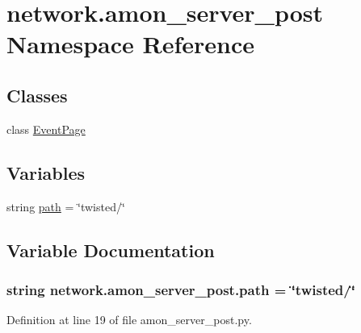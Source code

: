 \hypertarget{namespacenetwork_1_1amon__server__post}{\section{network.\-amon\-\_\-server\-\_\-post Namespace Reference}
\label{namespacenetwork_1_1amon__server__post}
}
\subsection*{Classes}
\begin{DoxyCompactItemize}
\item 
class \hyperlink{classnetwork_1_1amon__server__post_1_1_event_page}{Event\-Page}
\end{DoxyCompactItemize}
\subsection*{Variables}
\begin{DoxyCompactItemize}
\item 
string \hyperlink{namespacenetwork_1_1amon__server__post_aa871965a8bb9166b2aedc5cf739d6e5c}{path} = \char`\"{}twisted/\char`\"{}
\end{DoxyCompactItemize}


\subsection{Variable Documentation}
\hypertarget{namespacenetwork_1_1amon__server__post_aa871965a8bb9166b2aedc5cf739d6e5c}{
\subsubsection[{path}]{\setlength{\rightskip}{0pt plus 5cm}string network.\-amon\-\_\-server\-\_\-post.\-path = \char`\"{}twisted/\char`\"{}}}\label{namespacenetwork_1_1amon__server__post_aa871965a8bb9166b2aedc5cf739d6e5c}


Definition at line 19 of file amon\-\_\-server\-\_\-post.\-py.

